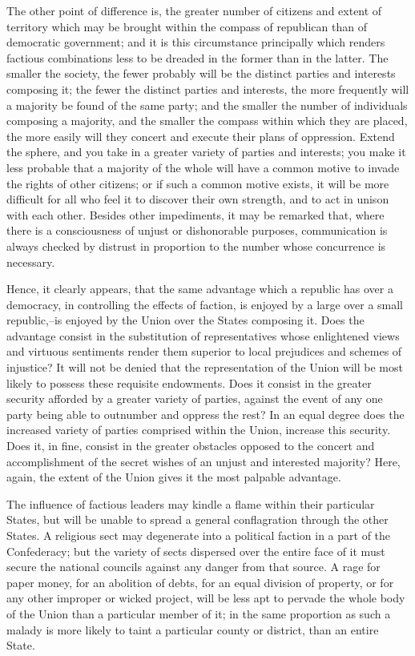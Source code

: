 The other point of difference is, the greater number of citizens and extent of territory which may be brought within the compass of republican than of democratic government; and it is this circumstance principally which renders factious combinations less to be dreaded in the former than in the latter. 
The smaller the society, the fewer probably will be the distinct parties and interests composing it; the fewer the distinct parties and interests, the more frequently will a majority be found of the same party; and the smaller the number of individuals composing a majority, and the smaller the compass within which they are placed, the more easily will they concert and execute their plans of oppression. 
Extend the sphere, and you take in a greater variety of parties and interests; you make it less probable that a majority of the whole will have a common motive to invade the rights of other citizens; or if such a common motive exists, it will be more difficult for all who feel it to discover their own strength, and to act in unison with each other. 
Besides other impediments, it may be remarked that, where there is a consciousness of unjust or dishonorable purposes, communication is always checked by distrust in proportion to the number whose concurrence is necessary.

Hence, it clearly appears, that the same advantage which a republic has over a democracy, in controlling the effects of faction, is enjoyed by a large over a small republic,--is enjoyed by the Union over the States composing it. 
Does the advantage consist in the substitution of representatives whose enlightened views and virtuous sentiments render them superior to local prejudices and schemes of injustice? 
It will not be denied that the representation of the Union will be most likely to possess these requisite endowments. 
Does it consist in the greater security afforded by a greater variety of parties, against the event of any one party being able to outnumber and oppress the rest? 
In an equal degree does the increased variety of parties comprised within the Union, increase this security. 
Does it, in fine, consist in the greater obstacles opposed to the concert and accomplishment of the secret wishes of an unjust and interested majority? 
Here, again, the extent of the Union gives it the most palpable advantage.

The influence of factious leaders may kindle a flame within their particular States, but will be unable to spread a general conflagration through the other States. 
A religious sect may degenerate into a political faction in a part of the Confederacy; but the variety of sects dispersed over the entire face of it must secure the national councils against any danger from that source. 
A rage for paper money, for an abolition of debts, for an equal division of property, or for any other improper or wicked project, will be less apt to pervade the whole body of the Union than a particular member of it; in the same proportion as such a malady is more likely to taint a particular county or district, than an entire State.

